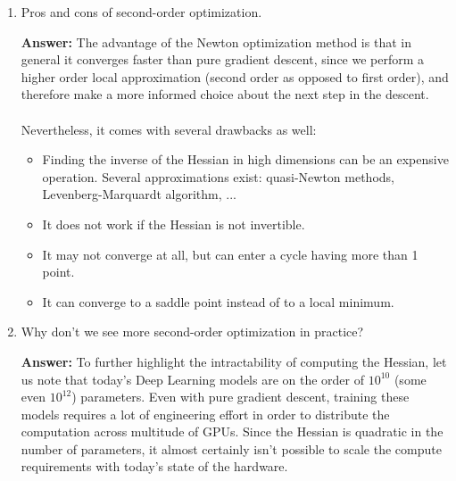 \documentclass{article}
\newenvironment{QandA}{\begin{enumerate}[label=\arabic*.]}{\end{enumerate}}
\newenvironment{InnerQandA}{\begin{enumerate}[label=\roman*.]}{\end{enumerate}}
\newenvironment{answer}{\par\normalfont \textbf{Answer:}}{}
\begin{document}
\begin{QandA}
\begin{InnerQandA}
        \item Pros and cons of second-order optimization.
        \begin{answer}
            The advantage of the Newton optimization method is that in general it converges faster than pure gradient descent, since we perform a higher order local approximation (second order as opposed to first order), and therefore make a more informed choice about the next step in the descent. \\\\
            Nevertheless, it comes with several drawbacks as well:
            \begin{itemize}
                \item Finding the inverse of the Hessian in high dimensions can be an expensive operation. Several approximations exist: quasi-Newton methods, Levenberg-Marquardt algorithm, ...
                \item It does not work if the Hessian is not invertible.
                \item It may not converge at all, but can enter a cycle having more than 1 point.
                \item It can converge to a saddle point instead of to a local minimum.
            \end{itemize}
        \end{answer}

        \item Why don’t we see more second-order optimization in practice?
        \begin{answer}
            To further highlight the intractability of computing the Hessian, let us note that today's Deep Learning models are on the order of $10^{10}$ (some even $10^{12}$) parameters. Even with pure gradient descent, training these models requires a lot of engineering effort in order to distribute the computation across multitude of GPUs. Since the Hessian is quadratic in the number of parameters, it almost certainly isn't possible to scale the compute requirements with today's state of the hardware.
        \end{answer}

    \end{InnerQandA}


\end{QandA}
\end{document}
